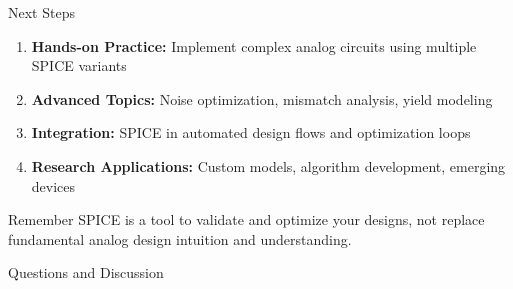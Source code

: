 \documentclass{beamer}
\begin{document}
\begin{frame}{Next Steps}
    \begin{enumerate}
        \item \textbf{Hands-on Practice:} Implement complex analog circuits using multiple SPICE variants
        \item \textbf{Advanced Topics:} Noise optimization, mismatch analysis, yield modeling
        \item \textbf{Integration:} SPICE in automated design flows and optimization loops
        \item \textbf{Research Applications:} Custom models, algorithm development, emerging devices
    \end{enumerate}
    
    \begin{alertblock}{Remember}
        SPICE is a tool to validate and optimize your designs, not replace fundamental analog design intuition and understanding.
    \end{alertblock}
    
    \begin{center}
        \Large{Questions and Discussion}
    \end{center}
\end{frame}
\end{document}
